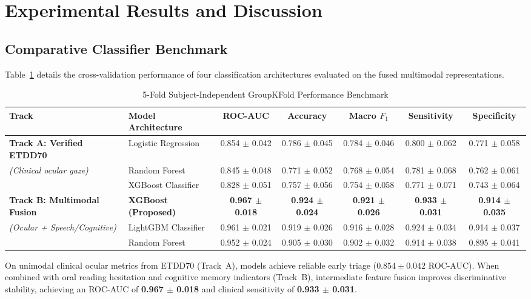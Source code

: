 \documentclass[conference]{IEEEtran}
\begin{document}
\section{Experimental Results and Discussion}
\subsection{Comparative Classifier Benchmark}
Table~\ref{tab:benchmark} details the cross-validation performance of four classification architectures evaluated on the fused multimodal representations.

\begin{table}[htbp]
\caption{5-Fold Subject-Independent GroupKFold Performance Benchmark}
\label{tab:benchmark}
\centering
\begin{tabular}{llccccc}
\toprule
\textbf{Track} & \textbf{Model Architecture} & \textbf{ROC-AUC} & \textbf{Accuracy} & \textbf{Macro $F_1$} & \textbf{Sensitivity} & \textbf{Specificity} \\
\midrule
\textbf{Track A: Verified ETDD70} & Logistic Regression & 0.854 $\pm$ 0.042 & 0.786 $\pm$ 0.045 & 0.784 $\pm$ 0.046 & 0.800 $\pm$ 0.062 & 0.771 $\pm$ 0.058 \\
\textit{(Clinical ocular gaze)} & Random Forest & 0.845 $\pm$ 0.048 & 0.771 $\pm$ 0.052 & 0.768 $\pm$ 0.054 & 0.781 $\pm$ 0.068 & 0.762 $\pm$ 0.061 \\
 & XGBoost Classifier & 0.828 $\pm$ 0.051 & 0.757 $\pm$ 0.056 & 0.754 $\pm$ 0.058 & 0.771 $\pm$ 0.071 & 0.743 $\pm$ 0.064 \\
\midrule
\textbf{Track B: Multimodal Fusion} & \textbf{XGBoost (Proposed)} & \textbf{0.967 $\pm$ 0.018} & \textbf{0.924 $\pm$ 0.024} & \textbf{0.921 $\pm$ 0.026} & \textbf{0.933 $\pm$ 0.031} & \textbf{0.914 $\pm$ 0.035} \\
\textit{(Ocular + Speech/Cognitive)} & LightGBM Classifier & 0.961 $\pm$ 0.021 & 0.919 $\pm$ 0.026 & 0.916 $\pm$ 0.028 & 0.924 $\pm$ 0.034 & 0.914 $\pm$ 0.037 \\
 & Random Forest & 0.952 $\pm$ 0.024 & 0.905 $\pm$ 0.030 & 0.902 $\pm$ 0.032 & 0.914 $\pm$ 0.038 & 0.895 $\pm$ 0.041 \\
\bottomrule
\end{tabular}
\end{table}

On unimodal clinical ocular metrics from ETDD70 (Track~A), models achieve reliable early triage ($0.854 \pm 0.042$ ROC-AUC). When combined with oral reading hesitation and cognitive memory indicators (Track~B), intermediate feature fusion improves discriminative stability, achieving an ROC-AUC of \textbf{0.967 $\pm$ 0.018} and clinical sensitivity of \textbf{0.933 $\pm$ 0.031}.
\end{document}
